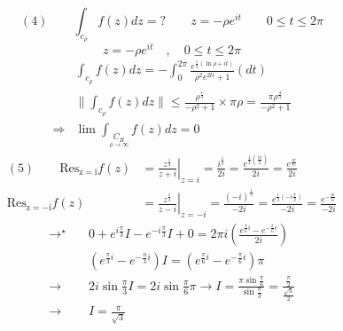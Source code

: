 \begin{equation*}
(4) \quad \quad \int_{c_{\rho}} f(z) d z=?  \quad \quad  z=-\rho e^{it} \quad \quad 0\leq t \leq 2\pi	
\end{equation*}
\begin{equation*}
		z = -\rho e^{it} \quad , \quad
	0 \leq t \leq 2\pi
\end{equation*}
\begin{align*}
&\int_{c_{\rho}} f(z) d z=-\int_{0}^{2\pi} \frac{e^{\frac{1}{3}(\ln \rho +it)}}{\rho^{2}e^{2ti}+1}(d t)	 \\
	&\|\int_{c_{\rho}} f(z) d z\|\leq \frac{\rho^{\frac{1}{3}}}{-\rho^{2}+1}\times\pi \rho=\frac{\pi \rho^{\frac{4}{3}}}{-\rho^{2}+1} \\
\Rightarrow & \lim \int_{\underset{\rho \rightarrow \infty}{C_R}}f(z)dz =0
\end{align*}
\begin{equation*}
\begin{split}
(5) \quad\quad \operatorname{Res_{z=i}} f(z)&=\left.\frac{z^{\frac{1}{3}}}{z+i}\right|_{z=i}=\frac{i^{\frac{1}{3}}}{2 i}=\frac{e^{\frac{1}{3} (\frac{i\pi}{2})}}{2 i}=\frac{e^{\frac{i\pi}{6}}}{2 i}	\\
\operatorname{Res_{z= -i}} f(z)&=\left.\frac{z^{\frac{1}{3}}}{z-i}\right|_{z=-i}=\frac{(-i)^{\frac{1}{3}}}{-2 i}=\frac{e^{\frac{1}{3}\left(-i \frac{\pi}{2}\right)}}{-2 i}=\frac{e^{-\frac{i\pi}{6}}}{-2 i}
\end{split}
\end{equation*}
\begin{align*}
	\rightarrow^{\star} \quad & 0+e^{i \frac{\pi}{3}} I-e^{-i \frac{\pi}{3}} I+0=2 \pi i\left(\frac{e^{\frac{\pi}{6} i}-e^{-\frac{\pi}{6}i}}{2 i}\right) \\
		&\left(e^{\frac{\pi}{3} i}-e^{-\frac{n}{3} i}\right) I=\left(e^{\frac{\pi}{6} i}-e^{-\frac{\pi}{6} i}\right) \pi \\
		\rightarrow \quad & 2i \sin \frac{\pi}{3} I=2i \sin \frac{\pi}{6} \pi \rightarrow I=\frac{\pi \sin \frac{\pi}{6}}{\sin \frac{\pi}{3}}=\frac{\frac{\pi}{2}}{\frac{\sqrt{3}}{2}} \\
		\rightarrow \quad &I= \frac{\pi}{\sqrt{3}}
\end{align*}
